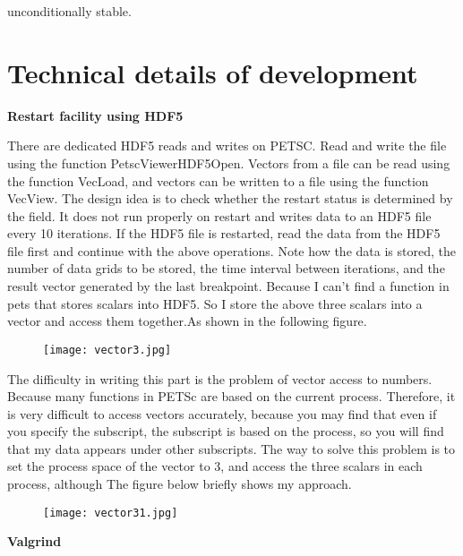 \documentclass[a4paper]{article}
\begin{document}
        unconditionally stable.
    \section{Technical details of development}
        \textbf{Restart facility using HDF5}

        There are dedicated HDF5 reads and writes on PETSC. Read and write the file using the function PetscViewerHDF5Open. Vectors from a file can be read using the function VecLoad, and vectors can be written to a file using the function VecView.
        The design idea is to check whether the restart status is determined by the field. It does not run properly on restart and writes data to an HDF5 file every 10 iterations. If the HDF5 file is restarted, read the data from the HDF5 file first and continue with the above operations. Note how the data is stored, the number of data grids to be stored, the time interval between iterations, and the result vector generated by the last breakpoint.
        Because I can't find a function in pets that stores scalars into HDF5. So I store the above three scalars into a vector and access them together.As shown in the following figure.
        \begin{figure}[H] 
            \centering 
            \texttt{[image: vector3.jpg]} 
            \label{Fig.vector3} 
        \end{figure}
        The difficulty in writing this part is the problem of vector access to numbers. Because many functions in PETSc are based on the current process. Therefore, it is very difficult to access vectors accurately, because you may find that even if you specify the subscript, the subscript is based on the process, so you will find that my data appears under other subscripts. The way to solve this problem is to set the process space of the vector to 3, and access the three scalars in each process, although
        The figure below briefly shows my approach.
        \begin{figure}[H] 
            \centering 
            \texttt{[image: vector31.jpg]} 
            \label{Fig.vector31} 
        \end{figure}
        \textbf{Valgrind}
\end{document}
